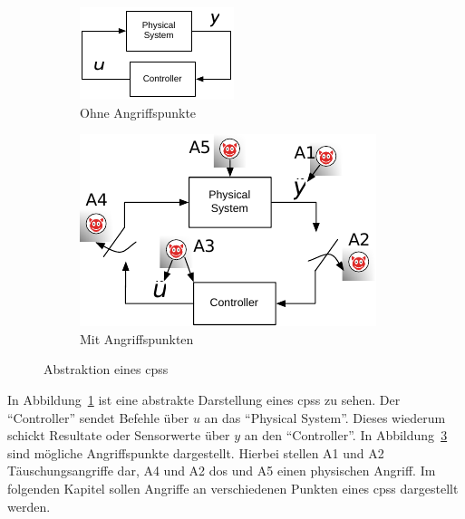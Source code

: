 \documentclass[final,bibliography=totocnumbered]{include/sikseminar}
\newcommand{\cps}{\glspl{cps}\xspace}
\begin{document}
\begin{figure}
    \centering
    \begin{subfigure}[b]{0.3\textwidth}
        \includegraphics[width=\textwidth]{abstrakt}
        \caption{Ohne Angriffspunkte}
        \label{fig:abstrakt}
    \end{subfigure}
    \qquad
    \begin{subfigure}[b]{0.4\textwidth}
        \includegraphics[width=\textwidth]{attack_points}
        \caption{Mit Angriffspunkten}
        \label{fig:attack_points}
    \end{subfigure}
    \caption{Abstraktion eines \cps~\cite{CAS08}}
\end{figure}

In Abbildung~\ref{fig:abstrakt} ist eine abstrakte Darstellung eines \cps zu sehen.
Der \enquote{Controller} sendet Befehle über $u$ an das \enquote{Physical System}.
Dieses wiederum schickt Resultate oder Sensorwerte über $y$ an den \enquote{Controller}.
In Abbildung~\ref{fig:attack_points} sind mögliche Angriffspunkte dargestellt.
Hierbei stellen A1 und A2 Täuschungsangriffe dar, A4 und A2 \gls{dos} und A5 einen physischen Angriff.
Im folgenden Kapitel sollen Angriffe an verschiedenen Punkten eines \cps dargestellt werden.
\end{document}
